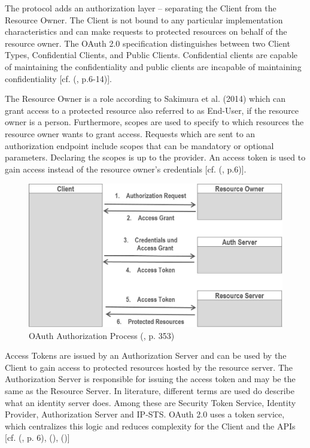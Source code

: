 {{		The protocol adds an authorization layer – separating the Client from the Resource Owner. 
		The Client is not bound to any particular implementation characteristics and can make requests to protected resources on behalf of the resource owner. The OAuth 2.0 specification distinguishes between two Client Types, Confidential Clients, and Public Clients. Confidential clients are capable of maintaining the confidentiality and public clients are incapable of maintaining confidentiality [cf. (\cite{Hardt:2012:OAuth2}, p.6-14)].
		
		The Resource Owner is a role according to Sakimura et al. (2014) which can grant access to a protected resource also referred to as End-User, if the resource owner is a person. Furthermore, scopes are used to specify to which resources the resource owner wants to grant access. Requests which are sent to an authorization endpoint include scopes that can be mandatory or optional parameters. Declaring the scopes is up to the provider. An access token is used to gain access instead of the resource owner’s credentials [cf. (\cite{Sakimura:2014:OpenIDConnect}, p.6)]. 
		
			\begin{figure}[h]
			\centering
			\includegraphics[width=0.8\linewidth]{images/oaut-process2}
			\caption{OAuth Authorization Process (\cite{LeBlanc:2011:SocialApplications}, p. 353)}
			\label{fig:oaut-process2}
		\end{figure}
		
		Access Tokens are issued by an Authorization Server and can be used by the Client to gain access to protected resources hosted by the resource server. The Authorization Server is responsible for issuing the access token and may be the same as the Resource Server. In literature, different terms are used do describe what an identity server does. Among these are Security Token Service, Identity Provider, Authorization Server and IP-STS. OAuth 2.0 uses a token service, which centralizes this logic and reduces complexity for the Client and the APIs [cf. (\cite{Sakimura:2014:OpenIDConnect}, p. 6), (\cite{Brock:2018:ID4}), (\cite{Boyd:2012:GSOAuth})]
		
}}
